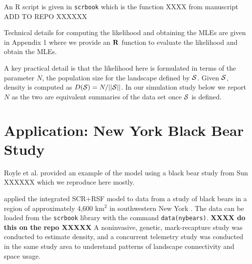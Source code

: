 An R script is given in \mbox{\tt scrbook} which is the function XXXX
from manuscript ADD TO REPO XXXXXX

Technical details for computing the likelihood and obtaining the MLEs
are given in Appendix 1 where we provide an ${\bf R}$ function to
evaluate the likelihood and obtain the MLEs.

A key practical detail
is that the likelihood here is formulated in terms of the parameter
$N$, the population size for the landscape defined by ${\cal
  S}$. Given ${\cal S}$, density is computed as $D({\cal S}) =
N/||{\cal S}||$. In our simulation study below we report $N$ as the
two are equivalent summaries of the data set once ${\cal S}$ is
defined.



\section{Application: New York Black Bear Study}
\label{rsf.chapt.nybears}


Royle et al. provided an example of the model using a black bear study
from Sun XXXXXX which we reproduce here mostly.

\citet{royle_etal:2012mee}
applied the integrated SCR+RSF model to data from a study of black bears in a
region of approximately 4,600 km$^2$ in southwestern New York
\citep{sun:2013}.
The data can be loaded from the \mbox{\tt scrbook} library with the
command \mbox{\tt data(nybears)}. {\bf XXXX do this on the repo XXXXX}
A noninvasive, genetic, mark-recapture
study was conducted to estimate density, and a concurrent telemetry
study was conducted in the same study area to understand patterns of
landscape connectivity and space usage.

